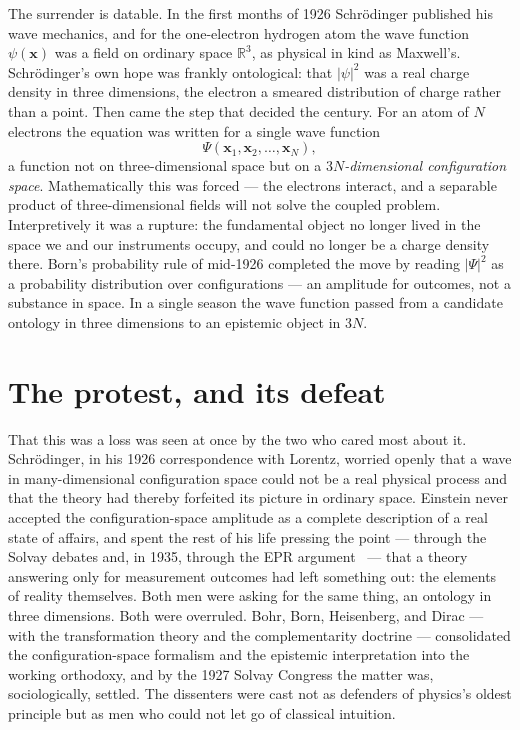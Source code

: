 \documentclass[11pt]{article}
\begin{document}
The surrender is datable. In the first months of 1926 Schr\"odinger published his wave mechanics, and for the
one-electron hydrogen atom the wave function $\psi(\mathbf x)$ was a field on ordinary space $\mathbb R^3$, as
physical in kind as Maxwell's. Schr\"odinger's own hope was frankly ontological: that $|\psi|^2$ was a real
charge density in three dimensions, the electron a smeared distribution of charge rather than a point. Then came
the step that decided the century. For an atom of $N$ electrons the equation was written for a single wave
function
\[
\Psi(\mathbf x_1,\mathbf x_2,\dots,\mathbf x_N),
\]
a function not on three-dimensional space but on a \emph{$3N$-dimensional configuration space}. Mathematically
this was forced --- the electrons interact, and a separable product of three-dimensional fields will not solve
the coupled problem. Interpretively it was a rupture: the fundamental object no longer lived in the space we and
our instruments occupy, and could no longer be a charge density there. Born's probability rule of mid-1926
completed the move by reading $|\Psi|^2$ as a probability distribution over configurations --- an amplitude for
outcomes, not a substance in space. In a single season the wave function passed from a candidate ontology in
three dimensions to an epistemic object in $3N$.

\section{The protest, and its defeat}

That this was a loss was seen at once by the two who cared most about it. Schr\"odinger, in his 1926
correspondence with Lorentz, worried openly that a wave in many-dimensional configuration space could not be a
real physical process and that the theory had thereby forfeited its picture in ordinary space. Einstein never
accepted the configuration-space amplitude as a complete description of a real state of affairs, and spent the
rest of his life pressing the point --- through the Solvay debates and, in 1935, through the EPR argument~\cite{EPR35} --- that
a theory answering only for measurement outcomes had left something out: the elements of reality themselves.
Both men were asking for the same thing, an ontology in three dimensions. Both were overruled. Bohr, Born,
Heisenberg, and Dirac --- with the transformation theory and the complementarity doctrine --- consolidated the
configuration-space formalism and the epistemic interpretation into the working orthodoxy, and by the 1927
Solvay Congress the matter was, sociologically, settled. The dissenters were cast not as defenders of physics's
oldest principle but as men who could not let go of classical intuition.
\end{document}
